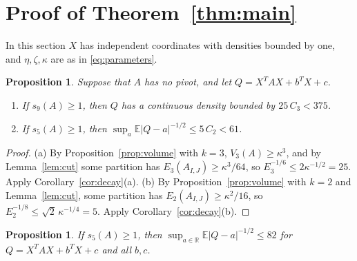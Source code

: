 \documentclass[11pt]{amsart}
\numberwithin{equation}{section}
\newtheorem{proposition}[theorem]{Proposition}
\theoremstyle{definition}
\theoremstyle{remark}
\newcommand{\R}{\mathbb R}
\newcommand{\E}{\mathbb E}
\newcommand{\1}{\mathbf 1}
\newcommand{\abs}[1]{\lvert #1\rvert}
\begin{document}
\section{Proof of Theorem~\ref{thm:main}}\label{sec:proof}

In this section $X$ has independent coordinates with densities bounded by one, and $\eta,\zeta,\kappa$ are as in \eqref{eq:parameters}.

\begin{proposition}\label{prop:nopivot}
Suppose that $A$ has no pivot, and let $Q=X^TAX+b^TX+c$.
\begin{enumerate}
\item[(a)] If $s_9(A)\ge1$, then $Q$ has a continuous density bounded by $25\,C_3<375$.
\item[(b)] If $s_5(A)\ge1$, then $\sup_a\E\abs{Q-a}^{-1/2}\le5\,C_2<61$.
\end{enumerate}
\end{proposition}

\begin{proof}
(a) By Proposition~\ref{prop:volume} with $k=3$, $V_3(A)\ge\kappa^3$, and by Lemma~\ref{lem:cut} some partition has $E_3(A_{I,J})\ge\kappa^3/64$, so $E_3^{-1/6}\le2\kappa^{-1/2}=25$. Apply Corollary~\ref{cor:decay}(a). (b) By Proposition~\ref{prop:volume} with $k=2$ and Lemma~\ref{lem:cut}, some partition has $E_2(A_{I,J})\ge\kappa^2/16$, so $E_2^{-1/8}\le\sqrt2\,\kappa^{-1/4}=5$. Apply Corollary~\ref{cor:decay}(b).
\end{proof}

\begin{proposition}\label{prop:halfpotential}
If $s_5(A)\ge1$, then $\sup_{a\in\R}\E\abs{Q-a}^{-1/2}\le82$ for $Q=X^TAX+b^TX+c$ and all $b,c$.
\end{proposition}
\end{document}
